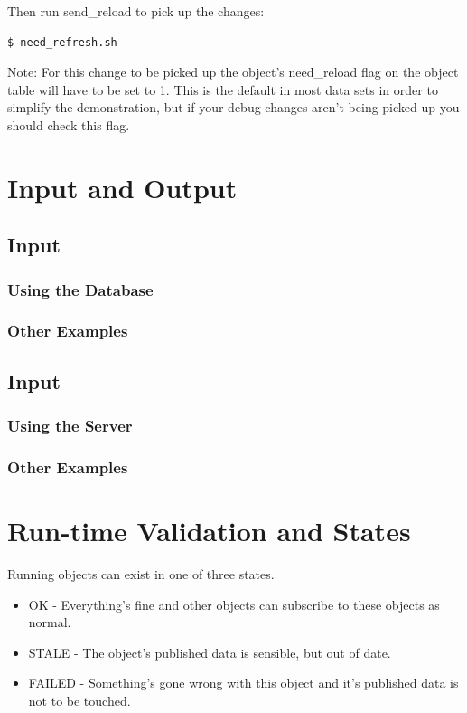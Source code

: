\documentclass{report}
\begin{document}
Then run send_reload to pick up the changes:

\begin{verbatim}
$ need_refresh.sh
\end{verbatim}

Note: For this change to be picked up the object's need_reload flag on the object table will have to be set to 1. This is the default in most data sets in order to simplify the demonstration, but if your debug changes aren't being picked up you should check this flag.

\section{Input and Output}

\subsection{Input}

\subsubsection{Using the Database}

\subsubsection{Other Examples}

\subsection{Input}

\subsubsection{Using the Server}

\subsubsection{Other Examples}

\section{Run-time Validation and States}

Running objects can exist in one of three states.

\begin{itemize}
\item OK - Everything's fine and other objects can subscribe to these objects as normal.
\item STALE - The object's published data is sensible, but out of date. 
\item FAILED - Something's gone wrong with this object and it's published data is not to be touched.
\end{itemize}
\end{document}
